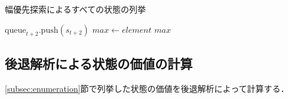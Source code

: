 \begin{algorithm}[tb]
\caption{幅優先探索によるすべての状態の列挙}
\label{alg:bfs}
\begin{algorithmic}[1]

            \State $\text{queue}_{t+2}.\text{push}(s_{t+2})$
        \EndFor
            \State $max \gets element$
        \EndIf
    \EndFor
    \State \Return $max$
\EndFunction

\end{algorithmic}
\end{algorithm}

\subsection{後退解析による状態の価値の計算}
\label{subsec:calculation}
\ref{subsec:enumeration}節で列挙した状態の価値を後退解析によって計算する．